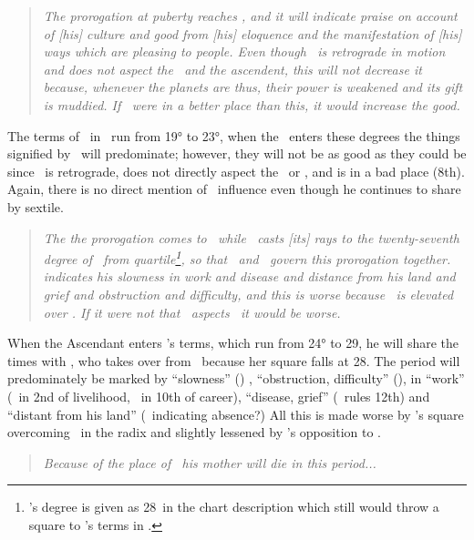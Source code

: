\begin{quote}
\textsl{The prorogation at puberty reaches \Jupiter, and it will indicate praise on account of [his] culture and good from [his] eloquence and the manifestation of [his] ways which are pleasing to people. Even though \Jupiter\, is retrograde in motion and does not aspect the \Moon\, and the ascendent, this will not decrease it because, whenever the planets are thus, their power is weakened and its gift is muddied. If \Jupiter\, were in a better place than this, it would increase the good.}
\end{quote}

The terms of \Jupiter\, in \Scorpio\, run from 19° to 23°, when the \ASC\, enters these degrees the things signified by \Jupiter\, will predominate; however, they will not be as good as they could be since \Jupiter\, is retrograde, does not directly aspect the \Moon\, or \ASC, and is in a bad place (8th). Again, there is no direct mention of \Mars\, influence even though he continues to share by sextile.

\begin{quote}
\textsl{The the prorogation comes to \Saturn\, while \Venus\, casts [its] rays to the twenty-seventh degree of \Scorpio\, from quartile\footnote{\Venus's degree is given as 28\Leo\, in the chart description which still would throw a square to \Saturn's terms in \Scorpio.}, so that \Saturn\, and \Venus\, govern this prorogation together. \Saturn\, indicates his slowness in work and disease and distance from his land and grief and obstruction and difficulty, and this is worse because \Mars\, is elevated over \Saturn. If it were not that \Jupiter\, aspects \Saturn\, it would be worse.}
\end{quote}

When the Ascendant enters \Saturn's terms, which run from 24° to 29\Scorpio,  he will share the times with \Venus, who takes over from \Mars\, because her square falls at 28\Scorpio. The period will predominately be marked by ``slowness'' (\Saturn) , ``obstruction, difficulty'' (\Square), in ``work'' (\Saturn\, in 2nd of livelihood, \Venus\, in 10th of career), ``disease, grief'' (\Venus\, rules 12th) and ``distant from his land'' (\Saturn\, indicating absence?) All this is made worse by \Mars's square overcoming \Saturn\, in the radix and slightly lessened by \Jupiter's opposition to \Saturn.

\begin{quote}
\textsl{Because of the place of \Saturn\, his mother will die in this period...}
\end{quote}


